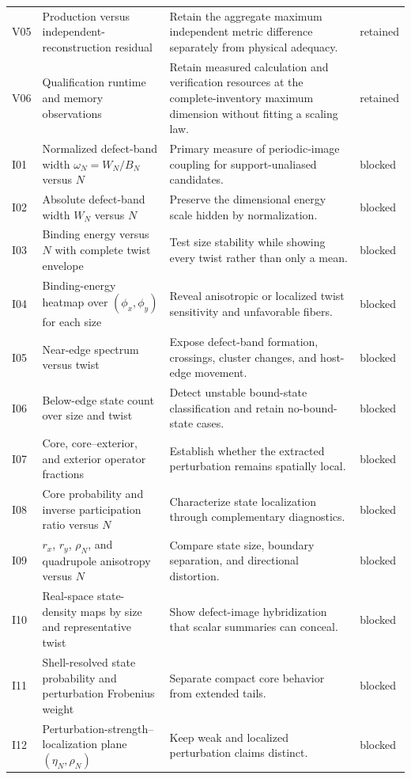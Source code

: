 \documentclass[11pt]{article}
\begin{document}
\begin{longtable}{@{}L{10mm}L{42mm}L{65mm}L{18mm}@{}}
V05 & Production versus independent-reconstruction residual & Retain the aggregate
maximum independent metric difference separately from physical adequacy. & retained \\
V06 & Qualification runtime and memory observations & Retain measured calculation and
verification resources at the complete-inventory maximum dimension without fitting a
scaling law. & retained \\
I01 & Normalized defect-band width $\omega_N=W_N/B_N$ versus $N$ & Primary measure of
periodic-image coupling for support-unaliased candidates. & blocked \\
I02 & Absolute defect-band width $W_N$ versus $N$ & Preserve the dimensional energy
scale hidden by normalization. & blocked \\
I03 & Binding energy versus $N$ with complete twist envelope & Test size stability while
showing every twist rather than only a mean. & blocked \\
I04 & Binding-energy heatmap over $(\phi_x,\phi_y)$ for each size & Reveal anisotropic or
localized twist sensitivity and unfavorable fibers. & blocked \\
I05 & Near-edge spectrum versus twist & Expose defect-band formation, crossings,
cluster changes, and host-edge movement. & blocked \\
I06 & Below-edge state count over size and twist & Detect unstable bound-state
classification and retain no-bound-state cases. & blocked \\
I07 & Core, core--exterior, and exterior operator fractions & Establish whether the
extracted perturbation remains spatially local. & blocked \\
I08 & Core probability and inverse participation ratio versus $N$ & Characterize state
localization through complementary diagnostics. & blocked \\
I09 & $r_x$, $r_y$, $\rho_N$, and quadrupole anisotropy versus $N$ & Compare state size,
boundary separation, and directional distortion. & blocked \\
I10 & Real-space state-density maps by size and representative twist & Show defect-image
hybridization that scalar summaries can conceal. & blocked \\
I11 & Shell-resolved state probability and perturbation Frobenius weight & Separate
compact core behavior from extended tails. & blocked \\
I12 & Perturbation-strength--localization plane $(\eta_N,\rho_N)$ & Keep weak and
localized perturbation claims distinct. & blocked \\

\end{longtable}
\end{document}
